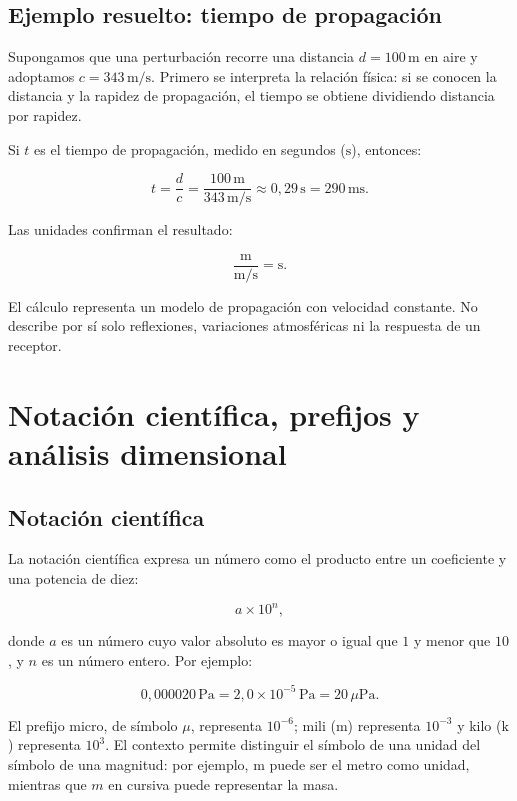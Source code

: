 \subsection{Ejemplo resuelto: tiempo de propagación}
\label{sec:u1-ejemplo-tiempo}

Supongamos que una perturbación recorre una distancia \(d=100\,\text{m}\) en aire y adoptamos \(c=343\,\text{m}/\text{s}\). Primero se interpreta la relación física: si se conocen la distancia y la rapidez de propagación, el tiempo se obtiene dividiendo distancia por rapidez.

Si \(t\) es el tiempo de propagación, medido en segundos (\(\text{s}\)), entonces:

\[
    t=\frac{d}{c}
     =\frac{100\,\text{m}}{343\,\text{m}/\text{s}}
     \approx0{,}29\,\text{s}
     =290\,\text{ms}.
\]

Las unidades confirman el resultado:

\[
    \frac{\text{m}}{\text{m}/\text{s}}=\text{s}.
\]

El cálculo representa un modelo de propagación con velocidad constante. No describe por sí solo reflexiones, variaciones atmosféricas ni la respuesta de un receptor.

\section{Notación científica, prefijos y análisis dimensional}
\label{sec:u1-notacion-dimensional}

\subsection{Notación científica}
\label{sec:u1-notacion-cientifica}

La notación científica expresa un número como el producto entre un coeficiente y una potencia de diez:

\[
    a\times10^{n},
\]

donde \(a\) es un número cuyo valor absoluto es mayor o igual que \(1\) y menor que \(10\), y \(n\) es un número entero. Por ejemplo:

\[
    0{,}000020\,\text{Pa}
    =2{,}0\times10^{-5}\,\text{Pa}
    =20\,\mu\text{Pa}.
\]

El prefijo micro, de símbolo \(\mu\), representa \(10^{-6}\); mili (\(\text{m}\)) representa \(10^{-3}\) y kilo (\(\text{k}\)) representa \(10^{3}\). El contexto permite distinguir el símbolo de una unidad del símbolo de una magnitud: por ejemplo, \(\text{m}\) puede ser el metro como unidad, mientras que \(m\) en cursiva puede representar la masa.

